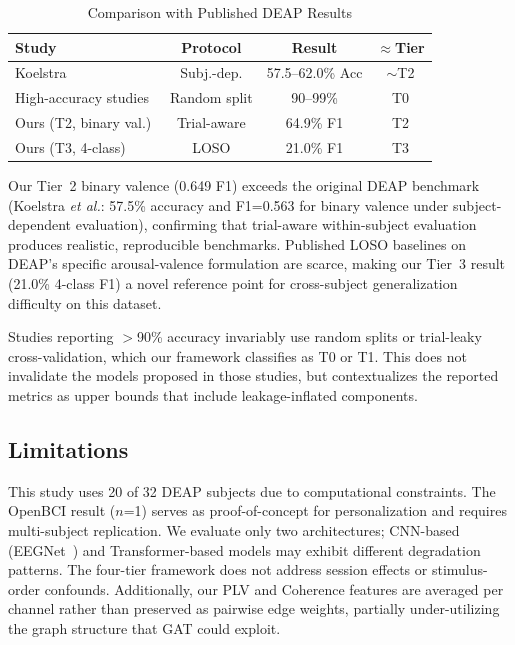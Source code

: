 \documentclass[a4paper, 10pt, conference]{ieeeconf}
\begin{document}
\begin{table}[t]
\centering
\caption{Comparison with Published DEAP Results}
\label{tab:lit}
\begin{tabular}{lccc}
\toprule
Study & Protocol & Result & $\approx$Tier \\
\midrule
Koelstra~\cite{koelstra2012} & Subj.-dep. & 57.5--62.0\% Acc & $\sim$T2 \\
High-accuracy studies~\cite{qian2024} & Random split & 90--99\% & T0 \\
\midrule
Ours (T2, binary val.) & Trial-aware & 64.9\% F1 & T2 \\
Ours (T3, 4-class) & LOSO & 21.0\% F1 & T3 \\
\bottomrule
\end{tabular}
\end{table}

Our Tier~2 binary valence (0.649 F1) exceeds the original DEAP benchmark (Koelstra \textit{et al.}: 57.5\% accuracy and F1=0.563 for binary valence under subject-dependent evaluation), confirming that trial-aware within-subject evaluation produces realistic, reproducible benchmarks. Published LOSO baselines on DEAP's specific arousal-valence formulation are scarce, making our Tier~3 result (21.0\% 4-class F1) a novel reference point for cross-subject generalization difficulty on this dataset.

Studies reporting $>$90\% accuracy invariably use random splits or trial-leaky cross-validation, which our framework classifies as T0 or T1. This does not invalidate the models proposed in those studies, but contextualizes the reported metrics as upper bounds that include leakage-inflated components.

\subsection{Limitations}

This study uses 20 of 32 DEAP subjects due to computational constraints. The OpenBCI result ($n$=1) serves as proof-of-concept for personalization and requires multi-subject replication. We evaluate only two architectures; CNN-based (EEGNet~\cite{lawhern2018}) and Transformer-based models may exhibit different degradation patterns. The four-tier framework does not address session effects or stimulus-order confounds. Additionally, our PLV and Coherence features are averaged per channel rather than preserved as pairwise edge weights, partially under-utilizing the graph structure that GAT could exploit.
\end{document}
